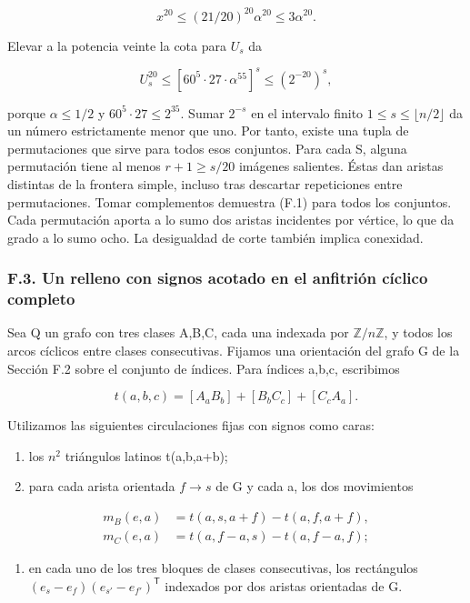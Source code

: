 \documentclass[spanish,11pt,a4paper]{article}
\providecommand{\tightlist}{\setlength{\itemsep}{0pt}\setlength{\parskip}{0pt}}
\begin{document}
\[x^{20}\le(21/20)^{20}\alpha^{20}\le3\alpha^{20}.\]

Elevar a la potencia veinte la cota para \(U_{s}\) da

\[U_s^{20}\le[60^5\cdot27\cdot\alpha^{55}]^s\le(2^{-20})^s,\]

porque \(\alpha\le 1/2\) y \(60^{5}\cdot 27\le 2^{35}\). Sumar \(2^{-s}\) en el intervalo finito \(1\le s\le \lfloor n/2\rfloor\) da un número estrictamente menor que uno. Por tanto, existe una tupla de permutaciones que sirve para todos esos conjuntos. Para cada S, alguna permutación tiene al menos \(r+1\ge s/20\) imágenes salientes. Éstas dan aristas distintas de la frontera simple, incluso tras descartar repeticiones entre permutaciones. Tomar complementos demuestra (F.1) para todos los conjuntos. Cada permutación aporta a lo sumo dos aristas incidentes por vértice, lo que da grado a lo sumo ocho. La desigualdad de corte también implica conexidad.

\subsubsection{F.3. Un relleno con signos acotado en el anfitrión cíclico completo}\label{f.3.-un-relleno-con-signos-acotado-en-el-anfitriuxf3n-cuxedclico-completo}

Sea Q un grafo con tres clases A,B,C, cada una indexada por \(\mathbb Z/n\mathbb Z\), y todos los arcos cíclicos entre clases consecutivas. Fijamos una orientación del grafo G de la Sección F.2 sobre el conjunto de índices. Para índices a,b,c, escribimos

\[t(a,b,c)=[A_aB_b]+[B_bC_c]+[C_cA_a].\]

Utilizamos las siguientes circulaciones fijas con signos como caras:

\begin{enumerate}
\def\labelenumi{\arabic{enumi}.}
\tightlist
\item
  los \(n^{2}\) triángulos latinos t(a,b,a+b);
\item
  para cada arista orientada \(f\to s\) de G y cada a, los dos movimientos
\end{enumerate}

\[\begin{aligned}m_B(e,a)&=t(a,s,a+f)-t(a,f,a+f),\\m_C(e,a)&=t(a,f-a,s)-t(a,f-a,f);\end{aligned}\]

\begin{enumerate}
\def\labelenumi{\arabic{enumi}.}
\setcounter{enumi}{2}
\tightlist
\item
  en cada uno de los tres bloques de clases consecutivas, los rectángulos \((e_s-e_f)(e_{s\prime}-e_{f\prime})^{\mathsf T}\) indexados por dos aristas orientadas de G.
\end{enumerate}
\end{document}
